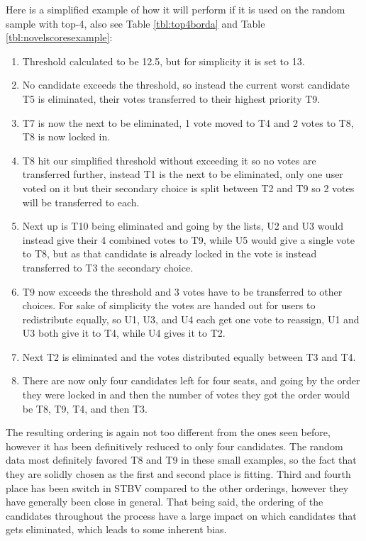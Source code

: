 Here is a simplified example of how it will perform if it is used on the random sample with top-4, also see Table \ref{tbl:top4borda} and Table \ref{tbl:novelscoresexample}:

\begin{enumerate}
	\item Threshold calculated to be 12.5, but for simplicity it is set to 13.
	\item No candidate exceeds the threshold, so instead the current worst candidate T5 is eliminated, their votes transferred to their highest priority T9.
	\item T7 is now the next to be eliminated, 1 vote moved to T4 and 2 votes to T8, T8 is now locked in.
	\item T8 hit our simplified threshold without exceeding it so no votes are transferred further, instead T1 is the next to be eliminated, only one user voted on it but their secondary choice is split between T2 and T9 so 2 votes will be transferred to each.
	\item Next up is T10 being eliminated and going by the lists, U2 and U3 would instead give their 4 combined votes to T9, while U5 would give a single vote to T8, but as that candidate is already locked in the vote is instead transferred to T3 the secondary choice.
	\item T9 now exceeds the threshold and 3 votes have to be transferred to other choices. For sake of simplicity the votes are handed out for users to redistribute equally, so U1, U3, and U4 each get one vote to reassign, U1 and U3 both give it to T4, while U4 gives it to T2.
	\item Next T2 is eliminated and the votes distributed equally between T3 and T4.
	\item There are now only four candidates left for four seats, and going by the order they were locked in and then the number of votes they got the order would be T8, T9, T4, and then T3.
\end{enumerate}

The resulting ordering is again not too different from the ones seen before, however it has been definitively reduced to only four candidates. The random data most definitely favored T8 and T9 in these small examples, so the fact that they are solidly chosen as the first and second place is fitting. Third and fourth place has been switch in STBV compared to the other orderings, however they have generally been close in general. That being said, the ordering of the candidates throughout the process have a large impact on which candidates that gets eliminated, which leads to some inherent bias.

